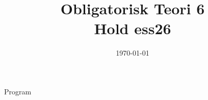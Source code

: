 \documentclass[11pt,aspectratio=169]{beamer}
\title{Obligatorisk Teori 6\\
Hold ess26}
\date{\today}
\begin{document}
\begin{frame}
  \titlepage
\end{frame}

\begin{frame}{Program}
  \tableofcontents
\end{frame}












\end{document}
